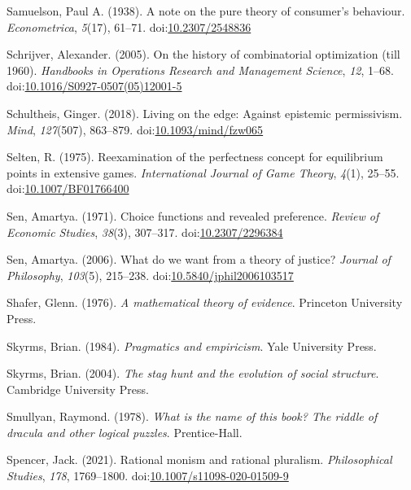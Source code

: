 \documentclass[
  12pt,
  letterpaper,
  DIV=11,
  numbers=noendperiod]{scrreprt}
\newlength{\cslhangindent}
\newenvironment{CSLReferences}[2] %
 {\begin{list}{}{%
  \setlength{\itemindent}{0pt}
  \setlength{\leftmargin}{0pt}
  \setlength{\parsep}{0pt}
  \ifodd #1
   \setlength{\leftmargin}{\cslhangindent}
   \setlength{\itemindent}{-1\cslhangindent}
  \fi
  \setlength{\itemsep}{#2\baselineskip}}}
 {\end{list}}
\begin{document}
\begin{CSLReferences}{1}{0}
Samuelson, Paul A. (1938). A note on the pure theory of consumer's
behaviour. \emph{Econometrica}, \emph{5}(17), 61--71.
doi:\href{https://doi.org/10.2307/2548836}{10.2307/2548836}

Schrijver, Alexander. (2005). On the history of combinatorial
optimization (till 1960). \emph{Handbooks in Operations Research and
Management Science}, \emph{12}, 1--68.
doi:\href{https://doi.org/10.1016/S0927-0507(05)12001-5}{10.1016/S0927-0507(05)12001-5}

Schultheis, Ginger. (2018). Living on the edge: Against epistemic
permissivism. \emph{Mind}, \emph{127}(507), 863--879.
doi:\href{https://doi.org/10.1093/mind/fzw065}{10.1093/mind/fzw065}

Selten, R. (1975). Reexamination of the perfectness concept for
equilibrium points in extensive games. \emph{International Journal of
Game Theory}, \emph{4}(1), 25--55.
doi:\href{https://doi.org/10.1007/BF01766400}{10.1007/BF01766400}

Sen, Amartya. (1971). Choice functions and revealed preference.
\emph{Review of Economic Studies}, \emph{38}(3), 307--317.
doi:\href{https://doi.org/10.2307/2296384}{10.2307/2296384}

Sen, Amartya. (2006). What do we want from a theory of justice?
\emph{Journal of Philosophy}, \emph{103}(5), 215--238.
doi:\href{https://doi.org/10.5840/jphil2006103517}{10.5840/jphil2006103517}

Shafer, Glenn. (1976). \emph{A mathematical theory of evidence}.
Princeton University Press.

Skyrms, Brian. (1984). \emph{Pragmatics and empiricism}. Yale University
Press.

Skyrms, Brian. (2004). \emph{The stag hunt and the evolution of social
structure}. {C}ambridge {U}niversity {P}ress.

Smullyan, Raymond. (1978). \emph{What is the name of this book? The
riddle of dracula and other logical puzzles}. Prentice-Hall.

Spencer, Jack. (2021). Rational monism and rational pluralism.
\emph{Philosophical Studies}, \emph{178}, 1769--1800.
doi:\href{https://doi.org/10.1007/s11098-020-01509-9}{10.1007/s11098-020-01509-9}


\end{CSLReferences}
\end{document}
